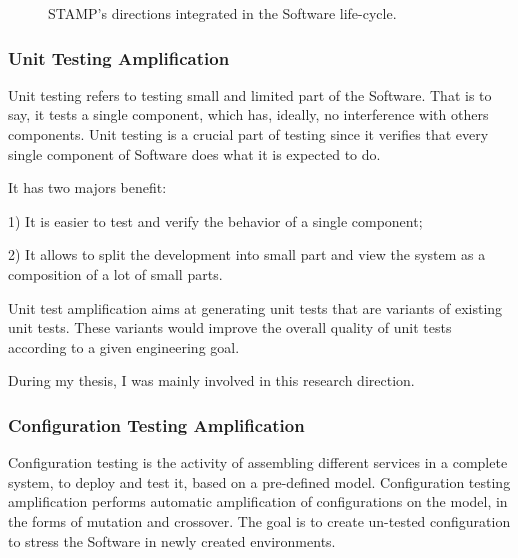 \begin{figure}[h]
	\centering
	\caption{STAMP's directions integrated in the Software life-cycle.}
	\label{fig:intro:lifecyle}
\end{figure}

\subsubsection{Unit Testing Amplification}
\label{subsubsec:intro:research-directions:unit-test-ampl}

Unit testing refers to testing small and limited part of the Software.
That is to say, it tests a single component, which has, ideally, no interference with others components.
Unit testing is a crucial part of testing since it verifies that every single component of Software does what it is expected to do.

It has two majors benefit:

1) It is easier to test and verify the behavior of a single component;

2) It allows to split the development into small part and view the system as a composition of a lot of small parts.

Unit test amplification aims at generating unit tests that are variants of existing unit tests.
These variants would improve the overall quality of unit tests according to a given engineering goal.

During my thesis, I was mainly involved in this research direction.

\subsubsection{Configuration Testing Amplification}
\label{subsubsec:intro:research-directions:config-ampl}

Configuration testing is the activity of assembling different services in a complete system, to deploy and test it, based on a pre-defined model.
Configuration testing amplification performs automatic amplification of configurations on the model, in the forms of mutation and crossover.
The goal is to create un-tested configuration to stress the Software in newly created environments.

